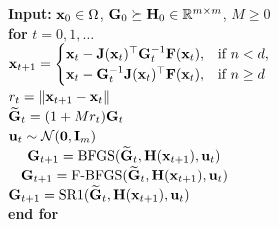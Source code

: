 \documentclass[11pt]{article}
\theoremstyle{plain}
\theoremstyle{definition}
\theoremstyle{remark}
\theoremstyle{plain}
\def\fN{{\mathcal{N}}}
\def\F{{\bf F}}
\def\G{{\bf G}}
\def\H{{\bf H}}
\def\I{{\bf I}}
\def \J{{\bf J}}
\def\u{{\bf u}}
\def\x{{\bf x}}
\def\0{{\bf 0}}
\def\RB{{\mathbb R}}
\def \srk{{\text{\rm SR1}}}
\def \bfgs{{\text{\rm BFGS}}}
\def \fbfgs{{\text{\rm F-BFGS}}}
\begin{document}
\begin{algorithm}[t]
\caption{Randomized Quasi-Gauss--Newton Methods (RQGN)}\label{alg:RQGN}
\begin{algorithmic}[1]
\STATE \textbf{Input:} $\x_0\in\Omega$, $\G_0\succeq\H_0\in\RB^{m\times m}$, $M\geq0$ \label{line:input} \\[0.15cm]
\STATE \textbf{for} $t=0,1,\ldots$ \\[0.15cm]
 		\STATE \quad
 		    $\x_{t+1}=\begin{cases}
               \x_t-\J(\x_t)^{\top}\G_t^{-1}\F(\x_t), &\text{if }n<d,\\
	 	    \x_t-\G_t^{-1}\J(\x_t)^{\top}\F(\x_t), &\text{if }n\geq d
	 	    \end{cases}$ \label{eq:line-update-x} \\[0.15cm]
	 	\STATE \quad $r_t=\|\x_{t+1}-\x_{t}\|$ \\[0.15cm]
 		\STATE \quad $\widetilde{\G}_{t}=(1+Mr_t)\G_t$ \\[0.15cm]
        \STATE \quad $\u_t\sim\fN(\0,\I_m)$ \\[0.15cm]
 		\STATE \quad [Option I]~~ $\G_{t+1}=\bfgs(\widetilde{\G}_t,\H(\x_{t+1}),\u_t)$ \label{eq:line-update-BFGS} \\[0.15cm]
 		\STATE \quad [Option II]~ $\G_{t+1}=\fbfgs(\widetilde{\G}_t,\H(\x_{t+1}),\u_t)$ \label{eq:line-update-F-BFGS} \\[0.15cm]
 		\STATE {} $\G_{t+1}=\srk(\widetilde{\G}_t,\H(\x_{t+1}),\u_t)$ \label{eq:line-update-SR1} \\[0.15cm]
\STATE \textbf{end for}
\end{algorithmic}
\end{algorithm}
\end{document}
